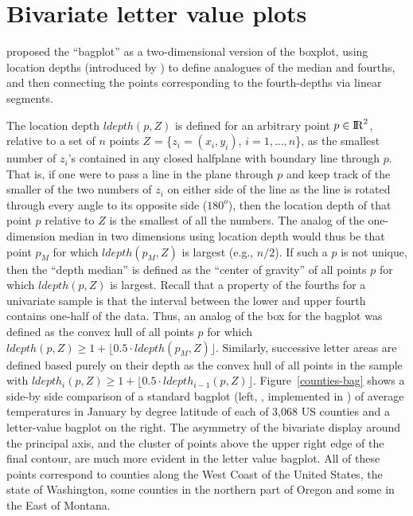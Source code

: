 \documentclass[12pt,oneside]{article}
\newcommand{\Reals}{{\rm I\kern-.1667em{}R}}
\begin{document}
\section{Bivariate letter value plots}
\label{sec:bivariate}

\citet{bagplots} proposed the ``bagplot'' as a two-dimensional version of the boxplot, using location depths (introduced by \citet{tukey75}) to define analogues of the median and fourths, and then connecting the points corresponding to the fourth-depths via linear segments. 

The location depth $ldepth(p,Z)$ is defined for an arbitrary point $p \in \Reals^2$, relative to a set of $n$ points $Z$ = \{$z_i = (x_i, y_i)$, $i = 1,...,n$\}, as the smallest number of $z_i$'s contained in any closed halfplane with boundary line through $p$. That is, if one were to pass a line in the plane through $p$ and keep track of the smaller of the two numbers of $z_i$ on either side of the line as the line is rotated through every angle to its opposite side ($180^o$), then the location depth of that point $p$ relative to $Z$ is the smallest of all the numbers. The analog of the one-dimension median in two dimensions using location depth would thus be that point $p_M$ for which $ldepth(p_M, Z)$ is largest (e.g., $n/2$). If such a $p$ is not unique, then the ``depth median'' is defined as the ``center of gravity'' of all points $p$ for which $ldepth(p,Z)$ is largest. Recall that a property of the fourths for a univariate sample is that the interval between the lower and upper fourth contains one-half of the data. Thus, an analog of the box for the bagplot was defined as the convex hull of all points $p$ for which $ldepth(p,Z) \ge 1 +  \lfloor 0.5 \cdot  ldepth(p_M, Z) \rfloor$. Similarly,  successive letter areas are defined based purely on their depth as the convex hull of all points in the sample with $ldepth_i(p,Z) \ge 1 +  \lfloor 0.5 \cdot  ldepth_{i-1}(p, Z) \rfloor$.
Figure~\ref{counties-bag} shows a side-by side comparison of a standard bagplot (left, \citet{bagplots}, implemented in \citet{aplpack}) of average temperatures in January by degree latitude of each of 3,068 US counties and a letter-value bagplot on the right.
The asymmetry of the bivariate display around the principal axis,
and the cluster of points above the upper right edge of the final contour,
are much more evident in the letter value bagplot.  All of these points correspond to counties along the West Coast of the United States, the state of Washington, some counties in the northern part of Oregon and some in the East of Montana.
\end{document}
